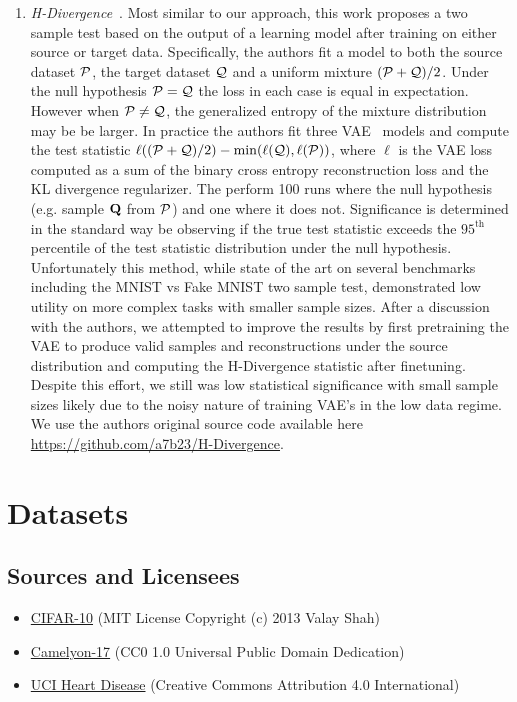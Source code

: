 \begin{enumerate}
    \item \textit{H-Divergence}~\citep{zhao2022comparing}. Most similar to our approach, this work proposes a two sample test based on the output of a learning model after training on either source or target data. Specifically, the authors fit a model to both the source dataset $\mathcal{P}$, the target dataset $\mathcal{Q}$ and a uniform mixture $(\mathcal{P}+\mathcal{Q})/2$.
    Under the null hypothesis $\mathcal{P}=\mathcal{Q}$ the loss in each case is equal in expectation. However when $\mathcal{P} \neq \mathcal{Q}$, the generalized entropy of the mixture distribution may be be larger. In practice the authors fit three VAE~\citep{DBLP:journals/corr/KingmaW13} models and compute the test statistic $\ell((\mathcal{P}+\mathcal{Q})/2) -\min(\ell(\mathcal{Q}), \ell(\mathcal{P}))$, where $\ell$ is the VAE loss
    computed as a sum of the binary cross entropy reconstruction loss and the KL divergence regularizer. The perform 100 runs where the null hypothesis (e.g. sample $\mathbf{Q}$ from $\mathcal{P}$) and one where it does not. Significance is determined in the standard way be observing if the true test statistic exceeds the $95^\text{th}$ percentile of the test statistic distribution under the null hypothesis.
    Unfortunately this method, while state of the art on several benchmarks including the MNIST vs Fake MNIST two sample test, demonstrated low utility on more complex tasks with smaller sample sizes. After a discussion with the authors, we attempted to improve the results by first pretraining the VAE to produce valid samples and reconstructions under the source distribution and computing the H-Divergence statistic
    after finetuning. Despite this effort, we still was low statistical significance with small sample sizes likely due to the noisy nature of training VAE's in the low data regime. We use the authors original source code available here \url{https://github.com/a7b23/H-Divergence}.
\end{enumerate}


\section{Datasets}
\label{sec:data}

\subsection{Sources and Licensees}\label{subsec:sources-and-licensees}
\begin{itemize}
    \item \href{https://peltarion.com/knowledge-center/documentation/terms/dataset-licenses/cifar-10}{CIFAR-10} (MIT License Copyright (c) 2013 Valay Shah)
    \item \href{https://camelyon17.grand-challenge.org/Data/}{Camelyon-17} (CC0 1.0 Universal Public Domain Dedication)
    \item \href{https://archive.ics.uci.edu/ml/datasets/Heart+Disease}{UCI Heart Disease} (Creative Commons Attribution 4.0 International)
\end{itemize}


